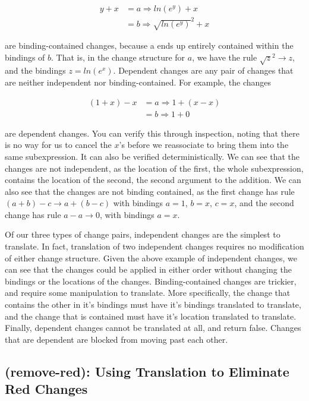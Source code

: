 \documentclass{article}
\newcommand{\insetarrow}[1]{=#1\Rightarrow}
\newcommand{\lnexp}[1]{ln\left(e^{#1}\right)}
\begin{document}
\begin{align*}
y + x &\insetarrow{a} \lnexp{y} + x \\
&\insetarrow{b} \sqrt{\lnexp{y}}^2 + x
\end{align*}

are binding-contained changes, 
because a ends up entirely contained within the bindings of $b$. 
That is, 
in the change structure for $a$, 
we have the rule $\sqrt{z}^2 \to z$,
and the bindings $z = ln\left(e^x\right)$.
Dependent changes are any pair of changes 
that are neither independent nor binding-contained. 
For example, 
the changes 

\begin{align*}
(1 + x) - x &\insetarrow{a} 1 + (x - x) \\
&\insetarrow{b} 1 + 0
\end{align*}

are dependent changes. 
You can verify this through inspection, 
noting that there is no way 
for us to cancel the $x$'s 
before we reassociate 
to bring them into the same subexpression. 
It can also be verified deterministically. 
We can see that the changes are not independent, 
as the location of the first, 
the whole subexpression, 
contains the location of the second, 
the second argument to the addition. 
We can also see that the changes are not binding contained, 
as the first change has rule $(a + b) - c \to a + (b - c)$
with bindings $a = 1$, 
$b = x$, 
$c = x$, 
and the second change has rule $a - a \to 0$, 
with bindings $a = x$.

Of our three types of change pairs, 
independent changes are the simplest to translate. 
In fact, 
translation of two independent changes 
requires no modification of either change structure. 
Given the above example of independent changes, 
we can see that the changes could be applied 
in either order 
without changing the bindings 
or the locations of the changes. 
Binding-contained changes are trickier, 
and require some manipulation to translate. 
More specifically, 
the change that contains the other in it's 
bindings must have it's bindings translated 
to translate, 
and the change that is contained 
must have it's location translated 
to translate. 
Finally, dependent changes cannot be translated at all, 
and return false. 
Changes that are dependent 
are blocked from moving past each other.

\subsection{(remove-red): Using Translation to Eliminate Red Changes}
\end{document}
